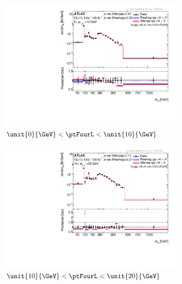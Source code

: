 \begin{figure}[H]
    \begin{subfigure}{.46\textwidth}\centering
      \includegraphics[width=.95\linewidth]{Figures/m4l/UnfoldedResults/linlog_Unfolded_Data_m4l_pt4l0-10.pdf}\caption{$\unit{0}{\GeV} <  \ptFourL  < \unit{10}{\GeV}$}\label{fig:sub-first}
    \end{subfigure}
    \begin{subfigure}{.46\textwidth}\centering
      \includegraphics[width=.95\linewidth]{Figures/m4l/UnfoldedResults/linlog_Unfolded_Data_m4l_pt4l10-20.pdf} \caption{$\unit{10}{\GeV} <  \ptFourL  < \unit{20}{\GeV}$}\label{fig:sub-second}
    \end{subfigure}
    \begin{subfigure}{.46\textwidth}\centering

\end{subfigure}
\end{figure}
